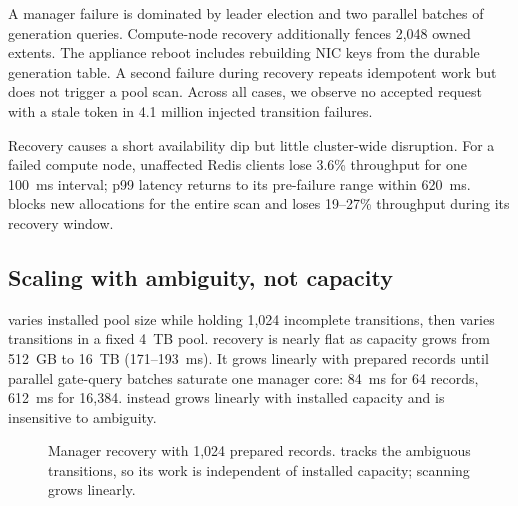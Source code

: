 A manager failure is dominated by leader election and two parallel batches of
generation queries. Compute-node recovery additionally fences 2,048 owned
extents. The appliance reboot includes rebuilding NIC keys from the durable
generation table. A second failure during recovery repeats idempotent work but
does not trigger a pool scan. Across all cases, we observe no accepted request
with a stale token in 4.1 million injected transition failures.

Recovery causes a short availability dip but little cluster-wide disruption.
For a failed compute node, unaffected Redis clients lose 3.6\% throughput for
one 100~ms interval; p99 latency returns to its pre-failure range within
620~ms. \baseline blocks new allocations for the entire scan and loses
19--27\% throughput during its recovery window.

\subsection{Scaling with ambiguity, not capacity}

 varies installed pool size while holding 1,024 incomplete
transitions, then varies transitions in a fixed 4~TB pool. \system recovery is
nearly flat as capacity grows from 512~GB to 16~TB (171--193~ms). It grows
linearly with prepared records until parallel gate-query batches saturate one
manager core: 84~ms for 64 records, 612~ms for 16,384. \baseline instead grows
linearly with installed capacity and is insensitive to ambiguity.

\begin{figure}[t]
  \centering
  \caption{Manager recovery with 1,024 prepared records. \system tracks the
  ambiguous transitions, so its work is independent of installed capacity;
  scanning grows linearly.}
  \label{fig:scaling}
\end{figure}

